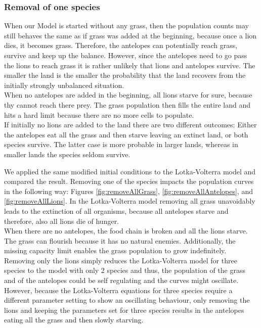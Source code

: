 \documentclass[11pt]{article}
\begin{document}
\subsubsection{Removal of one species}
\label{sec:DiscRemovalOfOne}
When our Model is started without any grass, then the population counts may still behaves the same as if grass was added at the beginning, because once a lion dies, it becomes grass. Therefore, the antelopes can potentially reach grass, survive and keep up the balance. However, since the antelopes need to go pass the lions to reach grass it is rather unlikely that lions and antelopes survive. The smaller the land is the smaller the probability that the land recovers from the initially strongly unbalanced situation.\\
When no antelopes are added in the beginning, all lions starve for sure, because thy cannot reach there prey. The grass population then fills the entire land and hits a hard limit because there are no more cells to populate. \\
If initially no lions are added to the land there are two different outcomes: Either the antelopes eat all the grass and then starve leaving an extinct land, or both species survive. The latter case is more probable in larger lands, whereas in smaller lands the species seldom survive.

We applied the same modified initial conditions to the Lotka-Volterra model and compared the result.
Removing one of the species impacts the population curves in the following way: Figures \ref{fig:removeAllGrass}, \ref{fig:removeAllAntelopes}, and \ref{fig:removeAllLions}. In the Lotka-Volterra model removing all grass unavoidably leads to the extinction of all organisms, because all antelopes starve and therefore, also all lions die of hunger.\\
When there are no antelopes, the food chain is broken and all the lions starve. The grass can flourish because it has no natural enemies. Additionally, the missing capacity limit enables the grass population to grow indefinitely.\\
Removing only the lions simply reduces the Lotka-Volterra model for three species to the model with only 2 species and thus, the population of the grass and of the antelopes could be self regulating and the curves might oscillate. However, because the Lotka-Volterra equations for three species require a different parameter setting to show an oscillating behaviour, only removing the lions and keeping the parameters set for three species results in the antelopes eating all the grass and then slowly starving.\\
\end{document}
